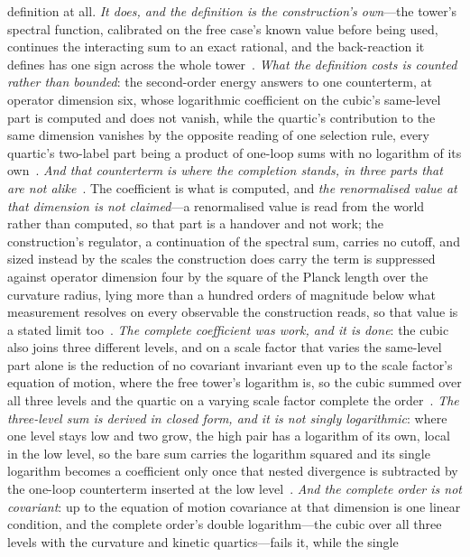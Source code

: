 \documentclass[11pt,a4paper]{article}
\theoremstyle{plain}
\theoremstyle{definition}
\theoremstyle{remark}
\begin{document}
\begin{enumerate}
definition at all. \emph{It does, and the
definition is the construction's own}---the tower's spectral function, calibrated on the free case's known value
before being used, continues the interacting sum to an exact rational, and the back-reaction it defines has one
sign across the whole tower~\cite{JanzenCanonicalTime}. \emph{What the definition costs is counted rather than
bounded}: the second-order energy answers to one counterterm, at operator dimension six, whose logarithmic
coefficient on the cubic's same-level part is computed and does not vanish, while the quartic's contribution to
the same dimension vanishes by the opposite reading of one selection rule, every quartic's two-label part being a
product of one-loop sums with no logarithm of its own~\cite{JanzenCanonicalTime}.
\emph{And that counterterm is where the completion stands, in three parts that are not
alike}~\cite{JanzenCanonicalTime}. The coefficient is what is computed, and \emph{the renormalised value at that
dimension is not claimed}---a renormalised value is read from the world rather than computed, so that part is a
handover and not work; the construction's regulator, a continuation of the spectral sum, carries no cutoff, and
sized instead by the scales the construction does carry the term is suppressed against operator dimension four by
the square of the Planck length over the curvature radius, lying more than a hundred orders of magnitude below what
measurement resolves on every observable the construction reads, so that value is a stated limit
too~\cite{JanzenCanonicalTime}. \emph{The complete coefficient was work, and it is done}: the cubic also joins three different levels, and on a scale
factor that varies the same-level part alone is the reduction of no covariant invariant even up to the scale
factor's equation of motion, where the free tower's logarithm is, so the cubic summed over all three levels and the
quartic on a varying scale factor complete the order~\cite{JanzenCanonicalTime}. \emph{The three-level sum is
derived in closed form, and it is not singly logarithmic}: where one level stays low and two grow, the high pair
has a logarithm of its own, local in the low level, so the bare sum carries the logarithm squared and its single
logarithm becomes a coefficient only once that nested divergence is subtracted by the one-loop counterterm
inserted at the low level~\cite{JanzenCanonicalTime}. \emph{And the complete order is not covariant}: up to the
equation of motion covariance at that dimension is one linear condition, and the complete order's double
logarithm---the cubic over all three levels with the curvature and kinetic quartics---fails it, while the single

\end{enumerate}
\end{document}

